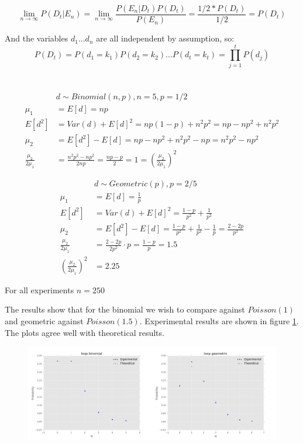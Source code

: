 \documentclass{article}
\begin{document}
$$ \lim_{n\to\infty} P(D_t | E_n) = \lim_{n\to\infty} \frac{P(E_n | D_t)P(D_t)}{P(E_n)} = \frac{1/2* P(D_t)}{1/2} = P(D_t) $$

And the variables $d_1...d_n$ are all independent by assumption, so:
$$P(D_t) = P(d_1 = k_1) P(d_2 = k_2) ... P(d_t = k_t) = \prod_{j=1}^{t} P(d_j)$$ 

\section{}
\subsection{}
$$
\begin{aligned}
&d\sim Binomial(n,p),n=5,p=1/2\\
\mu_1&=E[d]=np\\
E[d^2]&=Var(d)+E[d]^2=np(1-p)+n^2p^2=np-np^2+n^2p^2\\
\mu_2&=E[d^2]-E[d]=np-np^2+n^2p^2-np=n^2p^2-np^2\\
\frac{\mu_2}{2\mu_1}&=\frac{n^2p^2-np^2}{2np}=\frac{np-p}{2}=1=(\frac{\mu_2}{2\mu_1})^2
\end{aligned}
$$

$$
\begin{aligned}
&d\sim Geometric(p),p=2/5\\
\mu_1&=E[d]=\frac{1}{p}\\
E[d^2]&=Var(d)+E[d]^2=\frac{1-p}{p^2}+\frac{1}{p^2}\\
\mu_2&=E[d^2]-E[d]=\frac{1-p}{p^2}+\frac{1}{p^2}-\frac{1}{p}=\frac{2-2p}{p^2}\\
\frac{\mu_2}{2\mu_1}&=\frac{2-2p}{2p^2}\cdot p=\frac{1-p}{p}=1.5\\
(\frac{\mu_2}{2\mu_1})^2&=2.25
\end{aligned}
$$

For all experiments $n=250$

The results show that for the binomial we wish to compare against $Poisson(1)$ and geometric against $Poisson(1.5)$. Experimental results are shown in figure \ref{loop}. The plots agree well with theoretical results.

\begin{figure}[!ht]
	\centering
	\includegraphics[width=\textwidth]{loop.png}
	\label{loop}
\end{figure}
\end{document}
